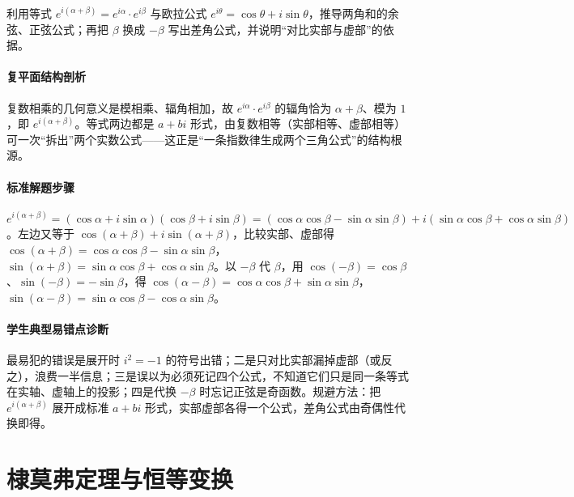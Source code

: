 \begin{problem}
利用等式 $e^{i(\alpha+\beta)}=e^{i\alpha}\cdot e^{i\beta}$ 与欧拉公式 $e^{i\theta}=\cos\theta+i\sin\theta$，推导两角和的余弦、正弦公式；再把 $\beta$ 换成 $-\beta$ 写出差角公式，并说明“对比实部与虚部”的依据。
\end{problem}
\begin{solution}
\paragraph{复平面结构剖析}
复数相乘的几何意义是模相乘、辐角相加，故 $e^{i\alpha}\cdot e^{i\beta}$ 的辐角恰为 $\alpha+\beta$、模为 $1$，即 $e^{i(\alpha+\beta)}$。等式两边都是 $a+bi$ 形式，由复数相等（实部相等、虚部相等）可一次“拆出”两个实数公式——这正是“一条指数律生成两个三角公式”的结构根源。
\paragraph{标准解题步骤}
$e^{i(\alpha+\beta)}=(\cos\alpha+i\sin\alpha)(\cos\beta+i\sin\beta)=(\cos\alpha\cos\beta-\sin\alpha\sin\beta)+i(\sin\alpha\cos\beta+\cos\alpha\sin\beta)$。左边又等于 $\cos(\alpha+\beta)+i\sin(\alpha+\beta)$，比较实部、虚部得 $\cos(\alpha+\beta)=\cos\alpha\cos\beta-\sin\alpha\sin\beta$，$\sin(\alpha+\beta)=\sin\alpha\cos\beta+\cos\alpha\sin\beta$。以 $-\beta$ 代 $\beta$，用 $\cos(-\beta)=\cos\beta$、$\sin(-\beta)=-\sin\beta$，得 $\cos(\alpha-\beta)=\cos\alpha\cos\beta+\sin\alpha\sin\beta$，$\sin(\alpha-\beta)=\sin\alpha\cos\beta-\cos\alpha\sin\beta$。
\paragraph{学生典型易错点诊断}
最易犯的错误是展开时 $i^2=-1$ 的符号出错；二是只对比实部漏掉虚部（或反之），浪费一半信息；三是误以为必须死记四个公式，不知道它们只是同一条等式在实轴、虚轴上的投影；四是代换 $-\beta$ 时忘记正弦是奇函数。规避方法：把 $e^{i(\alpha+\beta)}$ 展开成标准 $a+bi$ 形式，实部虚部各得一个公式，差角公式由奇偶性代换即得。
\end{solution}

\section{棣莫弗定理与恒等变换}

